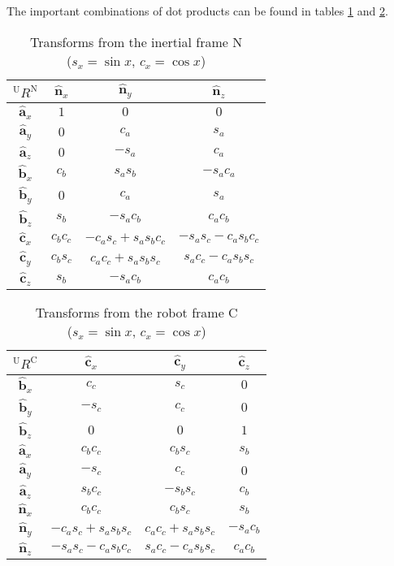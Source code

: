 \documentclass[lettersize,journal]{IEEEtran}
\begin{document}
The important combinations of dot products can be found in tables \ref{InertialTransforms} and \ref{RobotTransforms}. 
\begin{table}[!t] \centering
  \caption{Transforms from the inertial frame $\mathrm{N}$\\($s_x = \sin x$, $c_x = \cos x$)}
  \begin{tabular}{c|ccc}
    $^\mathrm{U}R^\mathrm{N}$ & $\mathbf{\hat{n}}_x$ & $\mathbf{\hat{n}}_y$ & $\mathbf{\hat{n}}_z$ \\
    \hline
    $\mathbf{\hat{a}}_x$ & $1$ & $0$ & $0$\\
    $\mathbf{\hat{a}}_y$ & $0$ & $c_a$ & $s_a$\\
    $\mathbf{\hat{a}}_z$ & $0$ & $-s_a$ & $c_a$\\
    \hline
    $\mathbf{\hat{b}}_x$ & $c_b$ & $s_as_b$ & $-s_ac_a$\\
    $\mathbf{\hat{b}}_y$ & $0$ & $c_a$ & $s_a$\\
    $\mathbf{\hat{b}}_z$ & $s_b$ & $-s_a c_b$ & $c_a c_b$\\
    \hline
    $\mathbf{\hat{c}}_x$ & $c_b c_c$ & $-c_a s_c + s_a s_b c_c$ & $-s_a s_c - c_a s_b c_c$\\
    $\mathbf{\hat{c}}_y$ & $c_b s_c$ & $c_a c_c + s_a s_b s_c$ & $s_a c_c - c_a s_b s_c$\\
    $\mathbf{\hat{c}}_z$ & $s_b$ & $-s_a c_b$ & $c_a c_b$
  \end{tabular} \label{InertialTransforms}
\end{table}

\begin{table}[!t] \centering
  \caption{Transforms from the robot frame $\mathrm{C}$\\($s_x = \sin x$, $c_x = \cos x$)}
  \begin{tabular}{c|ccc}
    $^\mathrm{U}R^\mathrm{C}$ & $\mathbf{\hat{c}}_x$ & $\mathbf{\hat{c}}_y$ & $\mathbf{\hat{c}}_z$ \\
    \hline
    $\mathbf{\hat{b}}_x$ & $c_c$ & $s_c$ & $0$ \\
    $\mathbf{\hat{b}}_y$ & $-s_c$ & $c_c$ & $0$ \\
    $\mathbf{\hat{b}}_z$ & $0$ & $0$ & $1$ \\
    \hline
    $\mathbf{\hat{a}}_x$ & $c_b c_c$ & $c_b s_c$ & $s_b$ \\
    $\mathbf{\hat{a}}_y$ & $-s_c$ & $c_c$ & $0$ \\
    $\mathbf{\hat{a}}_z$ & $s_b c_c$ & $-s_b s_c$ & $c_b$ \\
    \hline
    $\mathbf{\hat{n}}_x$ & $c_b c_c$ & $c_b s_c$ & $s_b$ \\
    $\mathbf{\hat{n}}_y$ & $-c_a s_c + s_a s_b s_c$ & $c_a c_c + s_a s_b s_c$ & $-s_a c_b$ \\
    $\mathbf{\hat{n}}_z$ & $-s_a s_c-c_a s_b c_c$ & $s_a c_c - c_a s_b s_c$ & $c_a c_b$
  \end{tabular} \label{RobotTransforms}
\end{table}
\end{document}
